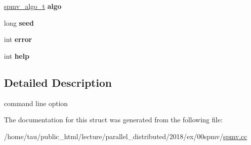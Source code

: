 \begin{DoxyCompactItemize}
\hyperlink{spmv_8cc_ad2cf0493af54bf76c5be68b4634fcab7}{spmv\+\_\+algo\+\_\+t} {\bfseries algo}
\item 
\mbox{\label{structcmdline__options__t_a065412d7cdc54cdae630389c3fda266e}} 
long {\bfseries seed}
\item 
\mbox{\label{structcmdline__options__t_a25f9087b240da0b93a4295fa5f173c88}} 
int {\bfseries error}
\item 
\mbox{\label{structcmdline__options__t_ab02741e43bb19900e87caaec3a8dd794}} 
int {\bfseries help}
\end{DoxyCompactItemize}


\subsection{Detailed Description}
command line option 

The documentation for this struct was generated from the following file\+:\begin{DoxyCompactItemize}
\item 
/home/tau/public\+\_\+html/lecture/parallel\+\_\+distributed/2018/ex/00spmv/\hyperlink{spmv_8cc}{spmv.\+cc}\end{DoxyCompactItemize}
